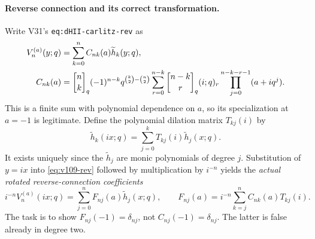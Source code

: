 \documentclass[11pt]{article}
\begin{document}
\paragraph{Reverse connection and its correct transformation.}
Write V31's \texttt{eq:dHII-carlitz-rev} as
\begin{align}\label{eq:v109-rev}
V_n^{(a)}(y;q)&=\sum_{k=0}^n C_{nk}(a)\widetilde h_k(y;q),\\
C_{nk}(a)&={n\brack k}_q(-1)^{n-k}q^{\binom{k}{2}-\binom{n}{2}}
\sum_{r=0}^{n-k}{n-k\brack r}_q(i;q)_r
\prod_{j=0}^{n-k-r-1}(a+iq^j).\notag
\end{align}
This is a finite sum with polynomial dependence on $a$, so its specialization at $a=-1$ is legitimate. Define the polynomial dilation matrix $T_{kj}(i)$ by
\[
 \widetilde h_k(ix;q)=\sum_{j=0}^k T_{kj}(i)\widetilde h_j(x;q).
\]
It exists uniquely since the $\widetilde h_j$ are monic polynomials of degree $j$. Substitution of $y=ix$ into \eqref{eq:v109-rev} followed by multiplication by $i^{-n}$ yields the \emph{actual rotated reverse-connection coefficients}
\begin{equation}\label{eq:v109-transformed}
 i^{-n}V_n^{(a)}(ix;q)=\sum_{j=0}^n F_{nj}(a)\widetilde h_j(x;q),\qquad
 F_{nj}(a)=i^{-n}\sum_{k=j}^n C_{nk}(a)T_{kj}(i).
\end{equation}
The task is to show $F_{nj}(-1)=\delta_{nj}$, not $C_{nj}(-1)=\delta_{nj}$. The latter is false already in degree two.
\end{document}
